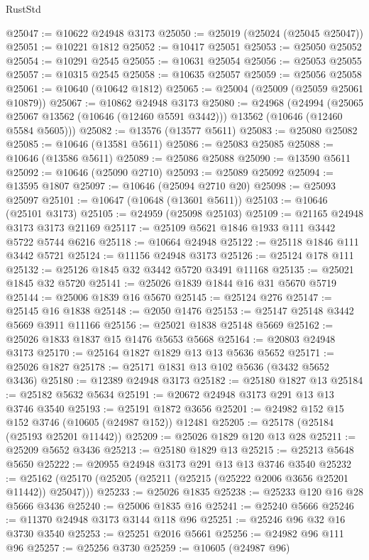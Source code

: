 \begin{lexlean}{RustStd}
\begin{coremodule}
@25047 := @10622 @24948 @3173
@25050 := @25019 (@25024 (@25045 @25047))
@25051 := @10221 @1812
@25052 := @10417 @25051
@25053 := @25050 @25052
@25054 := @10291 @2545
@25055 := @10631 @25054
@25056 := @25053 @25055
@25057 := @10315 @2545
@25058 := @10635 @25057
@25059 := @25056 @25058
@25061 := @10640 (@10642 @1812)
@25065 := @25004 (@25009 (@25059 @25061 @10879))
@25067 := @10862 @24948 @3173
@25080 := @24968
    (@24994
      (@25065 @25067 @13562 (@10646 (@12460 @5591 @3442)))
      @13562
      (@10646 (@12460 @5584 @5605)))
@25082 := @13576 (@13577 @5611)
@25083 := @25080 @25082
@25085 := @10646 (@13581 @5611)
@25086 := @25083 @25085
@25088 := @10646 (@13586 @5611)
@25089 := @25086 @25088
@25090 := @13590 @5611
@25092 := @10646 (@25090 @2710)
@25093 := @25089 @25092
@25094 := @13595 @1807
@25097 := @10646 (@25094 @2710 @20)
@25098 := @25093 @25097
@25101 := @10647 (@10648 (@13601 @5611))
@25103 := @10646 (@25101 @3173)
@25105 := @24959 (@25098 @25103)
@25109 := @21165 @24948 @3173 @3173 @21169
@25117 := @25109 @5621 @1846 @1933 @111 @3442 @5722 @5744 @6216
@25118 := @10664 @24948
@25122 := @25118 @1846 @111 @3442 @5721
@25124 := @11156 @24948 @3173
@25126 := @25124 @178 @111
@25132 := @25126 @1845 @32 @3442 @5720 @3491 @11168
@25135 := @25021 @1845 @32 @5720
@25141 := @25026 @1839 @1844 @16 @31 @5670 @5719
@25144 := @25006 @1839 @16 @5670
@25145 := @25124 @276
@25147 := @25145 @16 @1838
@25148 := @2050 @1476
@25153 := @25147 @25148 @3442 @5669 @3911 @11166
@25156 := @25021 @1838 @25148 @5669
@25162 := @25026 @1833 @1837 @15 @1476 @5653 @5668
@25164 := @20803 @24948 @3173
@25170 := @25164 @1827 @1829 @13 @13 @5636 @5652
@25171 := @25026 @1827
@25178 := @25171 @1831 @13 @102 @5636 (@3432 @5652 @3436)
@25180 := @12389 @24948 @3173
@25182 := @25180 @1827 @13
@25184 := @25182 @5632 @5634
@25191 := @20672 @24948 @3173 @291 @13 @13 @3746 @3540
@25193 := @25191 @1872 @3656
@25201 := @24982 @152 @15 @152 @3746 (@10605 (@24987 @152)) @12481
@25205 := @25178 (@25184 (@25193 @25201 @11442))
@25209 := @25026 @1829 @120 @13 @28
@25211 := @25209 @5652 @3436
@25213 := @25180 @1829 @13
@25215 := @25213 @5648 @5650
@25222 := @20955 @24948 @3173 @291 @13 @13 @3746 @3540
@25232 := @25162 (@25170 (@25205 (@25211 (@25215 (@25222 @2006 @3656 @25201 @11442)) @25047)))
@25233 := @25026 @1835
@25238 := @25233 @120 @16 @28 @5666 @3436
@25240 := @25006 @1835 @16
@25241 := @25240 @5666
@25246 := @11370 @24948 @3173 @3144 @118 @96
@25251 := @25246 @96 @32 @16 @3730 @3540
@25253 := @25251 @2016 @5661
@25256 := @24982 @96 @111 @96
@25257 := @25256 @3730
@25259 := @10605 (@24987 @96)

\end{coremodule}
\end{lexlean}
